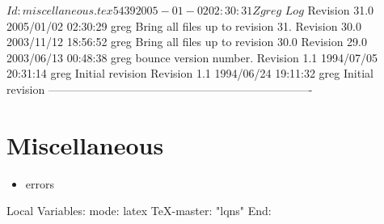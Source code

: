 \C 
\C $Id: miscellaneous.tex 5439 2005-01-02 02:30:31Z greg $
\C 
\C $Log$
\C Revision 31.0  2005/01/02 02:30:29  greg
\C Bring all files up to revision 31.
\C
\C Revision 30.0  2003/11/12 18:56:52  greg
\C Bring all files up to revision 30.0
\C
\C Revision 29.0  2003/06/13 00:48:38  greg
\C bounce version number.
\C
\C Revision 1.1  1994/07/05 20:31:14  greg
\C Initial revision
\C
\C Revision 1.1  1994/06/24  19:11:32  greg
\C Initial revision
\C
\C ----------------------------------------------------------------------
\chapter{Miscellaneous}
\label{sec:miscellaneous}

\begin{iftex}
\begin{itemize}
\item errors
\end{itemize}
\end{iftex}

\C Local Variables: 
\C mode: latex
\C TeX-master: "lqns"
\C End: 
